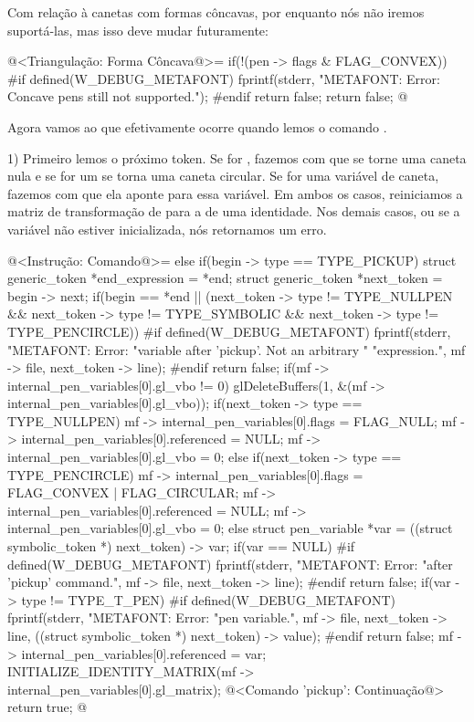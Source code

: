 {{{{{{Com relação à canetas com formas côncavas, por enquanto nós não iremos
suportá-las, mas isso deve mudar futuramente:

\iniciocodigo
@<Triangulação: Forma Côncava@>=
if(!(pen -> flags & FLAG_CONVEX)){
#if defined(W_DEBUG_METAFONT)
  fprintf(stderr, "METAFONT: Error: Concave pens still not supported.\n");
#endif
  return false;
}
return false;
@
\fimcodigo


Agora vamos ao que efetivamente ocorre quando lemos o
comando .

1) Primeiro lemos o próximo token. Se for ,
fazemos com que  se torne uma caneta nula e se
for um  se torna uma caneta circular. Se for uma
variável de caneta, fazemos com que ela aponte para essa variável. Em
ambos os casos, reiniciamos a matriz de transformação
de  para a de uma identidade. Nos demais casos,
ou se a variável não estiver inicializada, nós retornamos um erro.

\iniciocodigo
@<Instrução: Comando@>=
else if(begin -> type == TYPE_PICKUP){
  struct generic_token *end_expression = *end;
  struct generic_token *next_token = begin -> next;
  if(begin == *end ||
     (next_token -> type != TYPE_NULLPEN &&
      next_token -> type != TYPE_SYMBOLIC &&
      next_token -> type != TYPE_PENCIRCLE)){
#if defined(W_DEBUG_METAFONT)
    fprintf(stderr, "METAFONT: Error: %
                    "variable after 'pickup'. Not an arbitrary "
                    "expression.\n",
            mf -> file, next_token -> line);
#endif
    return false;
  }
  if(mf -> internal_pen_variables[0].gl_vbo != 0)
    glDeleteBuffers(1, &(mf -> internal_pen_variables[0].gl_vbo));
  if(next_token -> type == TYPE_NULLPEN){
    mf -> internal_pen_variables[0].flags = FLAG_NULL;
    mf -> internal_pen_variables[0].referenced = NULL;
    mf -> internal_pen_variables[0].gl_vbo = 0;
  }
  else if(next_token -> type == TYPE_PENCIRCLE){
    mf -> internal_pen_variables[0].flags = FLAG_CONVEX | FLAG_CIRCULAR;
    mf -> internal_pen_variables[0].referenced = NULL;
    mf -> internal_pen_variables[0].gl_vbo = 0;
  }
  else{
    struct pen_variable *var = ((struct symbolic_token *) next_token) -> var;
    if(var == NULL){
#if defined(W_DEBUG_METAFONT)
      fprintf(stderr, "METAFONT: Error: %
                      "after 'pickup' command.\n",
              mf -> file, next_token -> line);
#endif
      return false;
    }
    if(var -> type != TYPE_T_PEN){
#if defined(W_DEBUG_METAFONT)
      fprintf(stderr, "METAFONT: Error: %
                      "pen variable.\n",
              mf -> file, next_token -> line,
              ((struct symbolic_token *) next_token) -> value);
#endif
      return false;
    }
    mf -> internal_pen_variables[0].referenced = var;
  }
  INITIALIZE_IDENTITY_MATRIX(mf -> internal_pen_variables[0].gl_matrix);
  @<Comando 'pickup': Continuação@>
  return true;
}
@
\fimcodigo

}}}}}}
